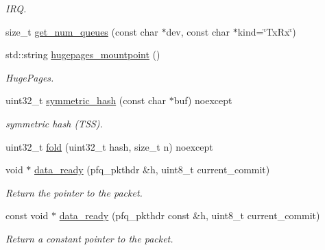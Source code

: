 \begin{DoxyCompactItemize}
\begin{DoxyCompactList}\small\item\em I\+R\+Q. \end{DoxyCompactList}\item 
size\+\_\+t \hyperlink{namespacepfq_a35dc28fdd850e9c82f1f3861cce2f9cb}{get\+\_\+num\+\_\+queues} (const char $\ast$dev, const char $\ast$kind=\char`\"{}Tx\+Rx\char`\"{})
\item 
std\+::string \hyperlink{namespacepfq_a46be800e747d99af1db9b92a8f296930}{hugepages\+\_\+mountpoint} ()
\begin{DoxyCompactList}\small\item\em Huge\+Pages. \end{DoxyCompactList}\item 
uint32\+\_\+t \hyperlink{namespacepfq_acd3646943e133a2651876f9ca0bd154c}{symmetric\+\_\+hash} (const char $\ast$buf) noexcept
\begin{DoxyCompactList}\small\item\em symmetric hash (T\+S\+S). \end{DoxyCompactList}\item 
uint32\+\_\+t \hyperlink{namespacepfq_a8abbfe940a92b69bac1a5d93fd354f9a}{fold} (uint32\+\_\+t hash, size\+\_\+t n) noexcept
\item 
void $\ast$ \hyperlink{namespacepfq_a89313b8c7a729b4e37b751db8ea522f4}{data\+\_\+ready} (pfq\+\_\+pkthdr \&h, uint8\+\_\+t current\+\_\+commit)
\begin{DoxyCompactList}\small\item\em Return the pointer to the packet. \end{DoxyCompactList}\item 
const void $\ast$ \hyperlink{namespacepfq_a50ce09535c2c899fe6b3c069681b4cae}{data\+\_\+ready} (pfq\+\_\+pkthdr const \&h, uint8\+\_\+t current\+\_\+commit)
\begin{DoxyCompactList}\small\item\em Return a constant pointer to the packet. \end{DoxyCompactList}\end{DoxyCompactItemize}


